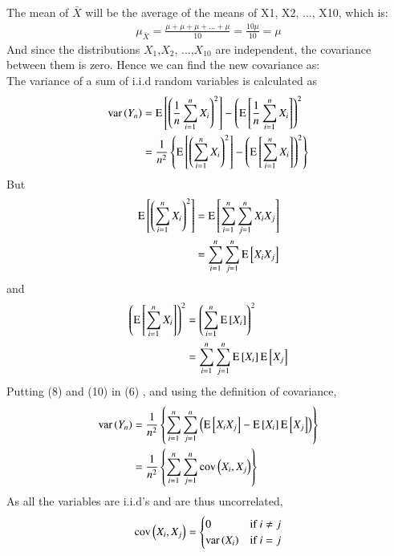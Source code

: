 \documentclass[journal,12pt,onecolumn]{IEEEtran}
\theoremstyle{remark}
\begin{document}
The mean of $\bar{X}$ will be the average of the means of X1, X2, ..., X10, which is:
\begin{align}
    \mu_{\bar{X}} =\frac{\mu + \mu + \mu + ... + \mu}{10} = \frac{10\mu}{10} = \mu   
\end{align}
And since the distributions $X_1$,$X_2$, ...,$X_{10}$ are independent, the covariance between them is zero. Hence we can find 
the new covariance as:\\
The variance of a sum of i.i.d random variables is calculated as
\begin{align}
    \text{var}\left(Y_n\right) &= \text{E}{}\left[\left(\frac{1}{n} \sum_{i=1}^{n} X_i\right)^2\right] - \left(\text{E}{}\left[\frac{1}{n} \sum_{i=1}^{n} X_i\right]\right)^2\\
    &= \frac{1}{n^2} \left\{\text{E}{}\left[\left(\sum_{i=1}^{n} X_i\right)^2\right] - \left(\text{E}{}\left[\sum_{i=1}^{n} X_i\right]\right)^2\right\}
\end{align}
But
\begin{align}
    \text{E}{}\left[\left(\sum_{i=1}^{n} X_i\right)^2\right] &= \text{E}{}\left[\sum_{i=1}^{n} \sum_{j=1}^{n} X_iX_j\right]\\
    &= \sum_{i=1}^{n} \sum_{j=1}^{n} \text{E}{}\left[X_iX_j\right] 
\end{align}
and 
\begin{align}
    \left(\text{E}{}\left[\sum_{i=1}^{n} X_i\right]\right)^2 &= \left(\sum_{i=1}^{n} \text{E}{}\left[X_i\right]\right)^2\\
    &= \sum_{i=1}^{n} \sum_{j=1}^{n} \text{E}{}\left[X_i\right] \text{E}{}\left[X_j\right] 
\end{align}
Putting (8) and (10) in (6) , and using the definition of covariance,
\begin{align}
    \text{var}\left(Y_n\right) &= \frac{1}{n^2} \left\{\sum_{i=1}^{n} \sum_{j=1}^{n} \left(\text{E}{}\left[X_iX_j\right] - \text{E}{}\left[X_i\right] \text{E}{}\left[X_j\right]\right)\right\}\\
    &= \frac{1}{n^2} \left\{\sum_{i=1}^{n} \sum_{j=1}^{n} \text{cov}\left(X_i, X_j\right)\right\} 
\end{align}
As all the variables are i.i.d's and are thus uncorrelated,
\begin{align}
    \text{cov}\left(X_i, X_j\right) =
    \begin{cases}
        0 & \text{if } i \ne j\\
        \text{var}\left(X_i\right) & \text{if } i = j
    \end{cases}
\end{align}
\end{document}
